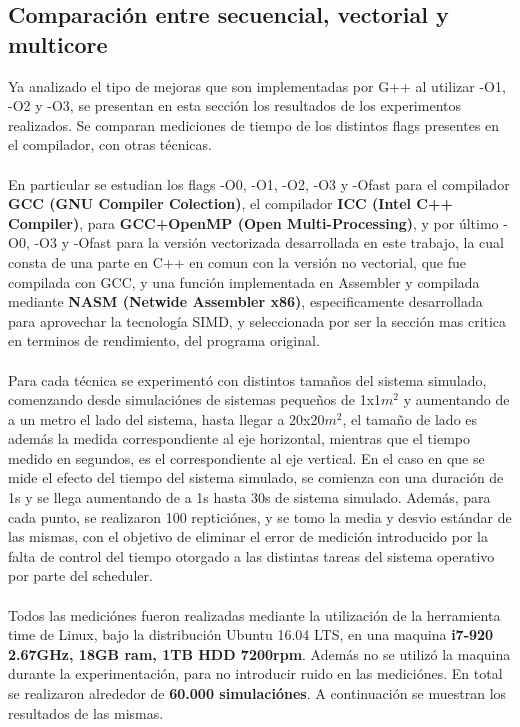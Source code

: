 \subsection{Comparación entre secuencial, vectorial y multicore}
Ya analizado el tipo de mejoras que son implementadas por G++ al utilizar -O1, -O2 y -O3, se presentan en esta sección los resultados de los experimentos realizados. Se comparan mediciones de tiempo de los distintos flags presentes en el compilador, con otras técnicas. 
~\\
~\\
En particular se estudian los flags -O0, -O1, -O2, -O3 y -Ofast para el compilador \textbf{GCC (GNU Compiler Colection)}, el compilador \textbf{ICC (Intel C++ Compiler)}, para \textbf{GCC+OpenMP (Open Multi-Processing)}, y por último -O0, -O3 y -Ofast para la versión vectorizada desarrollada en este trabajo, la cual consta de una parte en C++ en comun con la versión no vectorial, que fue compilada con GCC, y una función implementada en Assembler y compilada mediante \textbf{NASM (Netwide Assembler x86)}, especificamente desarrollada para aprovechar la tecnología SIMD, y seleccionada por ser la sección mas critica en terminos de rendimiento, del programa original.
~\\
~\\
Para cada técnica se experimentó con distintos tamaños del sistema simulado, comenzando desde simulaciónes de sistemas pequeños de 1x1$m^2$ y aumentando de a un metro el lado del sistema, hasta llegar a 20x20$m^2$, el tamaño de lado es además la medida correspondiente al eje horizontal, mientras que el tiempo medido en segundos, es el correspondiente al eje vertical. En el caso en que se mide el efecto del tiempo del sistema simulado, se comienza con una duración de 1s y se llega aumentando de a 1s hasta 30s de sistema simulado. Además, para cada punto, se realizaron 100 repticiónes, y se tomo la media y desvio estándar de las mismas, con el objetivo de eliminar el error de medición introducido por la falta de control del tiempo otorgado a las distintas tareas del sistema operativo por parte del scheduler. 
~\\
~\\
Todos las mediciónes fueron realizadas mediante la utilización de la herramienta time de Linux, bajo la distribución Ubuntu 16.04 LTS, en una maquina \textbf{i7-920 2.67GHz, 18GB ram, 1TB HDD 7200rpm}. Además no se utilizó la maquina durante la experimentación, para no introducir ruido en las mediciónes. En total se realizaron alrededor de \textbf{60.000 simulaciónes}. A continuación se muestran los resultados de las mismas.
~\\
~\\

